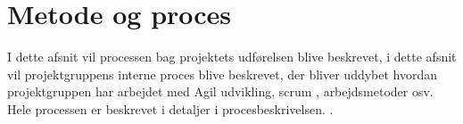 \chapter{Metode og proces}
\label{cha:method-and-process}

I dette afsnit vil processen bag projektets udførelsen blive beskrevet, i dette afsnit vil projektgruppens interne proces blive beskrevet, der bliver uddybet hvordan projektgruppen har arbejdet med Agil udvikling, scrum \cite[Scrum]{converge-terms}, arbejdsmetoder osv. Hele processen er beskrevet i detaljer i procesbeskrivelsen. .

